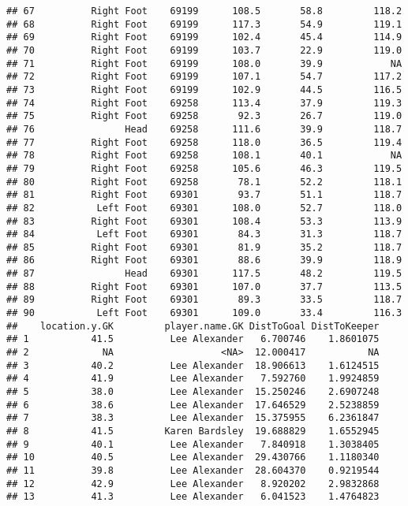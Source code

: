 \documentclass[]{article}
\begin{document}
\begin{verbatim}
## 67          Right Foot    69199      108.5       58.8         118.2
## 68          Right Foot    69199      117.3       54.9         119.1
## 69          Right Foot    69199      102.4       45.4         114.9
## 70          Right Foot    69199      103.7       22.9         119.0
## 71          Right Foot    69199      108.0       39.9            NA
## 72          Right Foot    69199      107.1       54.7         117.2
## 73          Right Foot    69199      102.9       44.5         116.5
## 74          Right Foot    69258      113.4       37.9         119.3
## 75          Right Foot    69258       92.3       26.7         119.0
## 76                Head    69258      111.6       39.9         118.7
## 77          Right Foot    69258      118.0       36.5         119.4
## 78          Right Foot    69258      108.1       40.1            NA
## 79          Right Foot    69258      105.6       46.3         119.5
## 80          Right Foot    69258       78.1       52.2         118.1
## 81          Right Foot    69301       93.7       51.1         118.7
## 82           Left Foot    69301      108.0       52.7         118.0
## 83          Right Foot    69301      108.4       53.3         113.9
## 84           Left Foot    69301       84.3       31.3         118.7
## 85          Right Foot    69301       81.9       35.2         118.7
## 86          Right Foot    69301       88.6       39.9         118.9
## 87                Head    69301      117.5       48.2         119.5
## 88          Right Foot    69301      107.0       37.7         113.5
## 89          Right Foot    69301       89.3       33.5         118.7
## 90           Left Foot    69301      109.0       33.4         116.3
##    location.y.GK         player.name.GK DistToGoal DistToKeeper
## 1           41.5          Lee Alexander   6.700746    1.8601075
## 2             NA                   <NA>  12.000417           NA
## 3           40.2          Lee Alexander  18.906613    1.6124515
## 4           41.9          Lee Alexander   7.592760    1.9924859
## 5           38.0          Lee Alexander  15.250246    2.6907248
## 6           38.6          Lee Alexander  17.646529    2.5238859
## 7           38.3          Lee Alexander  15.375955    6.2361847
## 8           41.5         Karen Bardsley  19.688829    1.6552945
## 9           40.1          Lee Alexander   7.840918    1.3038405
## 10          40.5          Lee Alexander  29.430766    1.1180340
## 11          39.8          Lee Alexander  28.604370    0.9219544
## 12          42.9          Lee Alexander   8.920202    2.9832868
## 13          41.3          Lee Alexander   6.041523    1.4764823

\end{verbatim}
\end{document}
